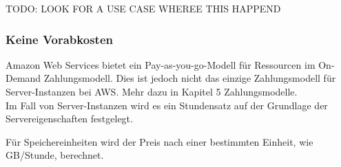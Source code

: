 TODO: LOOK FOR A USE CASE WHEREE THIS HAPPEND

\subsubsection{Keine Vorabkosten}
Amazon Web Services bietet ein Pay-as-you-go-Modell für Ressourcen im On-Demand Zahlungsmodell.
Dies ist jedoch nicht das einzige Zahlungsmodell für Server-Instanzen bei AWS. Mehr dazu in Kapitel 5 Zahlungsmodelle.
\\
Im Fall von Server-Instanzen wird es ein Stundensatz auf der Grundlage \newline der Servereigenschaften festgelegt.

Für Speichereinheiten wird der Preis nach einer bestimmten Einheit, wie GB/Stunde, berechnet.

\begin{comment}
Advantages of Cloud Technology
As the technology has matured over the last decade, companies are moving to the
cloud to lower costs, reduce complexity, and increase flexibility. The cloud
provides scalable and powerful compute solutions, low-cost, reliable storage, and addition, cloud technologies can be used to deploy solutions quickly and cost effectively around the world and on any device.
When you decouple from the data center, you’ll be able to:
x Decrease your TCO: Eliminate many of the costs related to building and
maintaining a data center or colocation deployment. Pay for only the
resources you consume.

x Reduce complexity: Reduce the need to manage infrastructure,
investigate licensing issues, or divert resources.
x Adjust capacity on the fly: Add or reduce resources, depending on
seasonal business needs, using infrastructure that is secure, reliable, and
broadly accessible.
x Reduce time to market: Design and develop new IT projects faster.
x Deploy quickly, even worldwide: Deploy applications across multiple
geographic areas.
x Increase efficiencies: Use automation to reduce or eliminate IT
management activities that waste time and resources.
x Innovate more: Spin up a new server and try out an idea. Each project
moves through the funnel more quickly because the cloud makes it faster
(and cheaper) to deploy, test, and launch new products and services.
x Spend your resources strategically: Switch to a DevOps model to free
your IT staff from operations and maintenance that can be handled by the
cloud services provider.
x Enhance security: Spend less time conducting security reviews on
infrastructure. Mature cloud providers have teams of people who focus on
security, offering best practices to ensure you’re compliant, no matter what
your industry.
\end{comment}

